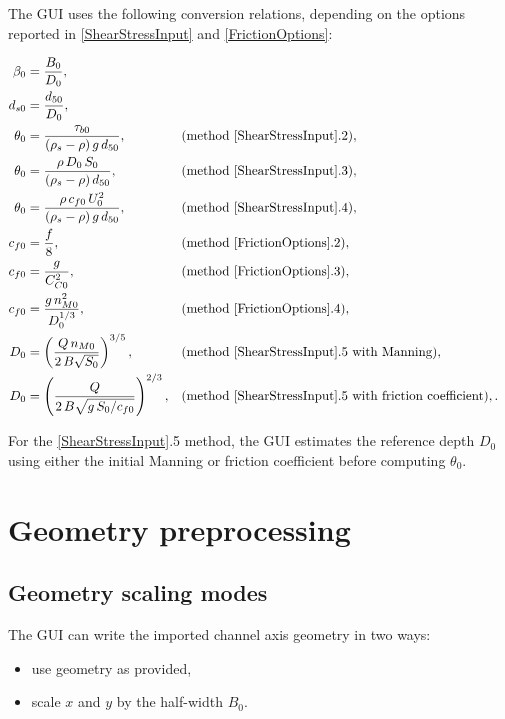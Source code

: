 \documentclass[11pt,a4paper]{article}
\begin{document}
The GUI uses the following conversion relations, depending on the options reported  in \ref{ShearStressInput} and 
\ref{FrictionOptions}:

\begin{subequations}
\begin{align}
	\beta_0 &= \frac{B_0}{D_0}, \\
	d_{s0} &= \frac{d_{50}}{D_0}, \\
	\theta_0 &= \frac{\tau_{b0}}{(\rho_s - \rho) \,g \, d_{50}}, &&  \text{(method \ref{ShearStressInput}.2)}, \\
	\theta_0 &= \frac{\rho \, D_0 \, S_0 }{(\rho_s - \rho) \, d_{50}}, && \text{(method \ref{ShearStressInput}.3)},\\
	\theta_0 &= \frac{\rho \, c_{f0} \, U_0^2}{(\rho_s - \rho) \,g\,d_{50}}, &&  \text{(method \ref{ShearStressInput}.4)},  \\
	c_{f0} &= \frac{f}{8}, &&  \text{(method \ref{FrictionOptions}.2)}, \\
	c_{f0} &= \frac{g}{C_{C0}^2}, && \text{(method \ref{FrictionOptions}.3)}, \\
	c_{f0} &= \frac{g \, n_{M0}^2}{D_0^{1/3}}, &&\text{(method \ref{FrictionOptions}.4)}, \\
	D_0 &= \left(\frac{Q \, n_{M0}}{2 \, B \sqrt{S_0}}\right)^{3/5}, &&   \text{(method \ref{ShearStressInput}.5 with Manning)}, \\
	D_0 &= \left(\frac{Q}{2 \, B\sqrt{g \, S_0/c_{f0}}}\right)^{2/3}, && \text{(method \ref{ShearStressInput}.5 with friction coefficient)},.
\end{align}
\end{subequations}

For the \ref{ShearStressInput}.5  method, the GUI estimates the reference depth $D_0$ using either the initial Manning or friction coefficient before computing $\theta_0$.

\section{Geometry preprocessing}

\subsection{Geometry scaling modes}

The GUI can write the imported channel axis geometry in two ways:
\begin{itemize}[leftmargin=1.2em]
	\item use geometry as provided,
	\item scale $x$ and $y$ by the half-width $B_0$.
\end{itemize}
\end{document}
